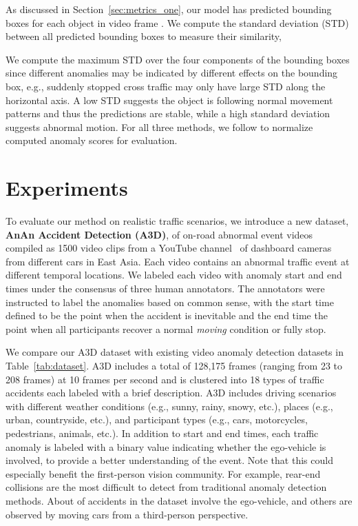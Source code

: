 \documentclass[letterpaper, 10 pt, conference]{ieeeconf}
\theoremstyle{definition}
\theoremstyle{remark}
\begin{document}
As discussed in Section~\ref{sec:metrics_one}, our model has 
predicted bounding boxes for each object in video frame .
We compute the standard deviation (STD) between all 
predicted bounding boxes to measure their similarity,

We compute the maximum STD over the four components of
the bounding boxes since different anomalies may be indicated by
different effects on the bounding box, e.g., suddenly stopped
cross traffic
may only have large STD along the horizontal axis.
A low STD suggests the object is following normal
movement patterns and thus the predictions
are stable, while a high standard deviation suggests abnormal motion.
For all three methods, we follow \cite{liu2018future} to
normalize computed anomaly scores for evaluation.

 \section{Experiments}

To evaluate our method on realistic traffic scenarios, we introduce a
new dataset, \textbf{AnAn Accident Detection (A3D)}, of on-road abnormal 
event videos compiled as 1500 video clips from a YouTube 
channel~\cite{ananxingche} of dashboard cameras from different cars in East Asia.
Each video contains an abnormal traffic event at different temporal
locations. We labeled each video with anomaly start and end times
under the consensus of three human annotators. The
annotators were instructed to label the anomalies based on common sense, with the start
time defined to be the point when the accident is inevitable and the end time the point
when all participants recover a normal \textit{moving} condition or fully stop. 

We compare our A3D dataset with existing video anomaly detection
datasets in Table~\ref{tab:dataset}. A3D includes a total
of 128,175 frames (ranging from 23 to 208 frames)
at 10 frames per second and is clustered into 18 types
of traffic accidents each labeled with a brief description.
A3D includes driving scenarios with different weather conditions
(e.g., sunny, rainy, snowy, etc.), places
(e.g., urban, countryside, etc.), and participant types
(e.g., cars, motorcycles, pedestrians, animals, etc.).
In addition to start and end times, each traffic anomaly is 
labeled with a binary value indicating whether the ego-vehicle is involved,
to provide a better
understanding of the event. Note that this could especially benefit the
first-person vision community. For example, rear-end collisions are
the most difficult to detect from traditional
anomaly detection methods. About  of accidents in the dataset involve the
ego-vehicle, and others are observed by moving cars from
a third-person perspective.
\end{document}
